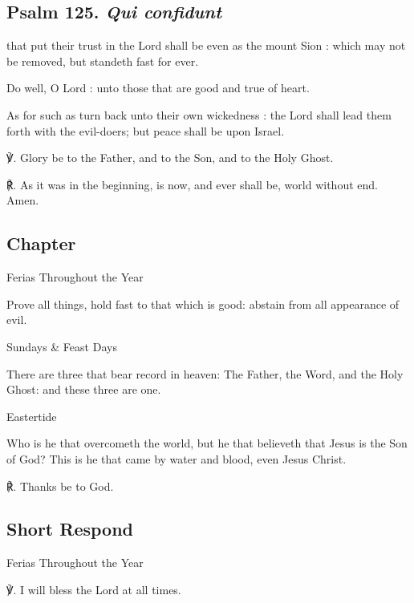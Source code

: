 \begin{multicols}{2}
\subsection{Psalm 125. \textit{Qui confidunt}}
 that put their trust in the Lord shall be even as the mount Sion : which may not be removed, but standeth fast for ever.\par
{}
Do well, O Lord : unto those that are good and true of heart.\par
{}As for such as turn back unto their own wickedness : the Lord shall lead them forth with the evil-doers; but peace shall be upon Israel.\par
℣. Glory be to the Father, and to the Son, and to the Holy Ghost.\par
℟. As it was in the beginning, is now, and ever shall be, world without end. Amen.

\newcolumn

\subsection{Chapter}
\begin{inhead}
	Ferias Throughout the Year
\end{inhead}\par\noindent
Prove all things, hold fast to that which is good: abstain from all appearance of evil.

\begin{inhead}
	Sundays \& Feast Days
\end{inhead}\par\noindent
There are three that bear record in heaven: The Father, the Word, and the Holy Ghost: and these three are one.

\begin{inhead}
	Eastertide
\end{inhead}\par\noindent
Who is he that overcometh the world, but he that believeth that Jesus is the Son of God? This is he that came by water and blood, even Jesus Christ.

℟. Thanks be to God.

\subsection{Short Respond}
\begin{inhead}
	Ferias Throughout the Year
\end{inhead}
℣. I will bless the Lord at all times.


\end{multicols}

